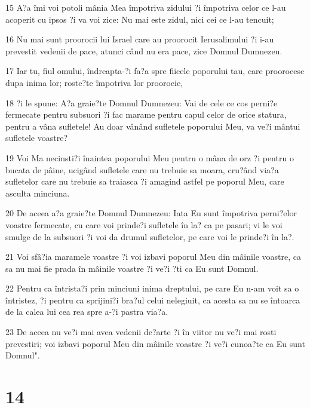 \par 15 A?a îmi voi potoli mânia Mea împotriva zidului ?i împotriva celor ce l-au acoperit cu ipsos ?i va voi zice: Nu mai este zidul, nici cei ce l-au tencuit;
\par 16 Nu mai sunt proorocii lui Israel care au proorocit Ierusalimului ?i i-au prevestit vedenii de pace, atunci când nu era pace, zice Domnul Dumnezeu.
\par 17 Iar tu, fiul omului, îndreapta-?i fa?a spre fiicele poporului tau, care proorocesc dupa inima lor; roste?te împotriva lor proorocie,
\par 18 ?i le spune: A?a graie?te Domnul Dumnezeu: Vai de cele ce cos perni?e fermecate pentru subsuori ?i fac marame pentru capul celor de orice statura, pentru a vâna sufletele! Au doar vânând sufletele poporului Meu, va ve?i mântui sufletele voastre?
\par 19 Voi Ma necinsti?i înaintea poporului Meu pentru o mâna de orz ?i pentru o bucata de pâine, ucigând sufletele care nu trebuie sa moara, cru?ând via?a sufletelor care nu trebuie sa traiasca ?i amagind astfel pe poporul Meu, care asculta minciuna.
\par 20 De aceea a?a graie?te Domnul Dumnezeu: Iata Eu sunt împotriva perni?elor voastre fermecate, cu care voi prinde?i sufletele în la? ca pe pasari; vi le voi smulge de la subsuori ?i voi da drumul sufletelor, pe care voi le prinde?i în la?.
\par 21 Voi sfâ?ia maramele voastre ?i voi izbavi poporul Meu din mâinile voastre, ca sa nu mai fie prada în mâinile voastre ?i ve?i ?ti ca Eu sunt Domnul.
\par 22 Pentru ca întrista?i prin minciuni inima dreptului, pe care Eu n-am voit sa o întristez, ?i pentru ca sprijini?i bra?ul celui nelegiuit, ca acesta sa nu se întoarca de la calea lui cea rea spre a-?i pastra via?a.
\par 23 De aceea nu ve?i mai avea vedenii de?arte ?i în viitor nu ve?i mai rosti prevestiri; voi izbavi poporul Meu din mâinile voastre ?i ve?i cunoa?te ca Eu sunt Domnul".

\chapter{14}

